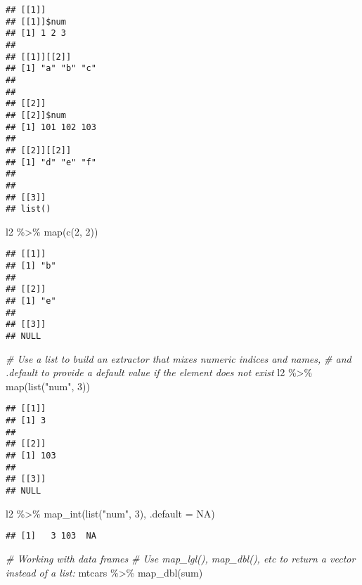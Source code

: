 \documentclass[
]{book}
\newenvironment{Shaded}{\begin{snugshade}}{\end{snugshade}}
\newcommand{\AttributeTok}[1]{\textcolor[rgb]{0.77,0.63,0.00}{#1}}
\newcommand{\CommentTok}[1]{\textcolor[rgb]{0.56,0.35,0.01}{\textit{#1}}}
\newcommand{\ConstantTok}[1]{\textcolor[rgb]{0.00,0.00,0.00}{#1}}
\newcommand{\DecValTok}[1]{\textcolor[rgb]{0.00,0.00,0.81}{#1}}
\newcommand{\FunctionTok}[1]{\textcolor[rgb]{0.00,0.00,0.00}{#1}}
\newcommand{\NormalTok}[1]{#1}
\newcommand{\SpecialCharTok}[1]{\textcolor[rgb]{0.00,0.00,0.00}{#1}}
\newcommand{\StringTok}[1]{\textcolor[rgb]{0.31,0.60,0.02}{#1}}
\begin{document}
\begin{verbatim}
## [[1]]
## [[1]]$num
## [1] 1 2 3
## 
## [[1]][[2]]
## [1] "a" "b" "c"
## 
## 
## [[2]]
## [[2]]$num
## [1] 101 102 103
## 
## [[2]][[2]]
## [1] "d" "e" "f"
## 
## 
## [[3]]
## list()
\end{verbatim}

\begin{Shaded}
\begin{Highlighting}[]
\NormalTok{l2 }\SpecialCharTok{\%\textgreater{}\%} 
  \FunctionTok{map}\NormalTok{(}\FunctionTok{c}\NormalTok{(}\DecValTok{2}\NormalTok{, }\DecValTok{2}\NormalTok{))}
\end{Highlighting}
\end{Shaded}

\begin{verbatim}
## [[1]]
## [1] "b"
## 
## [[2]]
## [1] "e"
## 
## [[3]]
## NULL
\end{verbatim}

\begin{Shaded}
\begin{Highlighting}[]
\CommentTok{\# Use a list to build an extractor that mixes numeric indices and names,}
\CommentTok{\# and .default to provide a default value if the element does not exist}
\NormalTok{l2 }\SpecialCharTok{\%\textgreater{}\%} 
  \FunctionTok{map}\NormalTok{(}\FunctionTok{list}\NormalTok{(}\StringTok{"num"}\NormalTok{, }\DecValTok{3}\NormalTok{))}
\end{Highlighting}
\end{Shaded}

\begin{verbatim}
## [[1]]
## [1] 3
## 
## [[2]]
## [1] 103
## 
## [[3]]
## NULL
\end{verbatim}

\begin{Shaded}
\begin{Highlighting}[]
\NormalTok{l2 }\SpecialCharTok{\%\textgreater{}\%} 
  \FunctionTok{map\_int}\NormalTok{(}\FunctionTok{list}\NormalTok{(}\StringTok{"num"}\NormalTok{, }\DecValTok{3}\NormalTok{), }\AttributeTok{.default =} \ConstantTok{NA}\NormalTok{)}
\end{Highlighting}
\end{Shaded}

\begin{verbatim}
## [1]   3 103  NA
\end{verbatim}

\begin{Shaded}
\begin{Highlighting}[]
\CommentTok{\# Working with data frames}
\CommentTok{\# Use map\_lgl(), map\_dbl(), etc to return a vector instead of a list:}
\NormalTok{mtcars }\SpecialCharTok{\%\textgreater{}\%} 
  \FunctionTok{map\_dbl}\NormalTok{(sum)}
\end{Highlighting}
\end{Shaded}
\end{document}
